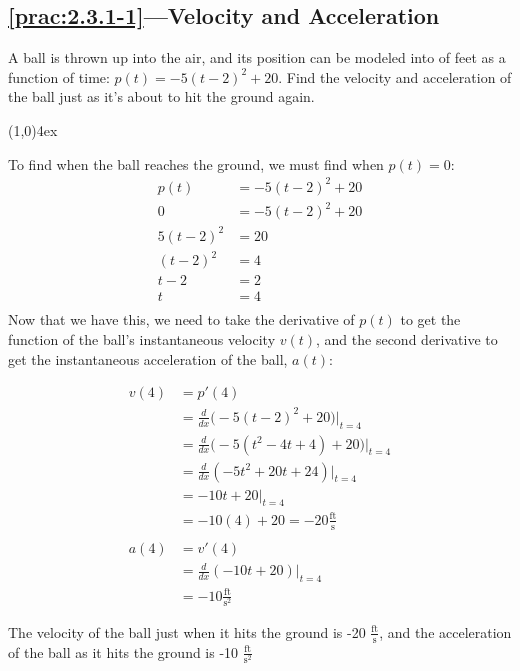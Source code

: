 \documentclass{MathNotes}
\newcommand{\br}{
\begin{center}
\line(1,0){4ex}
\end{center}}
\begin{document}
\subsection*{\ref{prac:2.3.1-1}---Velocity and Acceleration}\label{ans:2.3.1-1}
A ball is thrown up into the air, and its position can be modeled into
of feet as a function of time: $p(t)=-5(t-2)^2+20$. Find the velocity and
acceleration of the ball just as it's about to hit the ground again.
\br
To find when the ball reaches the ground, we must find when $p(t)=0$:
\begin{align*}
    p(t)&=-5(t-2)^2+20\\
       0&=-5(t-2)^2+20\\
    5(t-2)^2&=20\\
    (t-2)^2&=4\\
    t-2&=2\\
    t&=4\\
\end{align*}
Now that we have this, we need to take the derivative of $p(t)$ to get the
function of the ball's instantaneous velocity $v(t)$, and the second derivative
to get the instantaneous acceleration of the ball, $a(t)$:

\begin{align*}
    v(4)&=p'(4)\\
    &=\frac{d}{dx}\big(-5(t-2)^2+20\big)\Big|_{t=4}\\
    &=\frac{d}{dx}\big(-5(t^2-4t+4)+20\big)\Big|_{t=4}\\
    &=\frac{d}{dx}(-5t^2+20t+24)\Big|_{t=4}\\
    &=-10t+20\Big|_{t=4}\\
    &=-10(4)+20=-20\frac{\text{ft}}{\text{s}}\\
    \\
    a(4)&=v'(4)\\
    &=\frac{d}{dx}(-10t+20)\Big|_{t=4}\\
    &=-10\frac{\text{ft}}{\text{s}^2}
\end{align*}

The velocity of the ball just when it hits the ground is -20 
$\displaystyle\frac{\text{ft}}{\text{s}}$, and the acceleration of the ball as 
it hits the ground is -10 $\frac{\text{ft}}{\text{s}^2}$

\newpage
\end{document}
